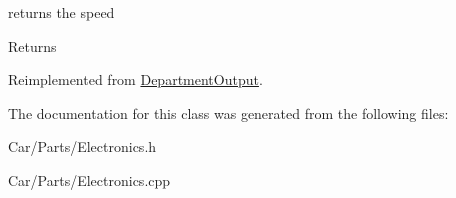 returns the speed \begin{DoxyReturn}{Returns}

\end{DoxyReturn}


Reimplemented from \hyperlink{classDepartmentOutput_a90caf8934a687d18b9855f19a421ecef}{Department\+Output}.



The documentation for this class was generated from the following files\+:\begin{DoxyCompactItemize}
\item 
Car/\+Parts/Electronics.\+h\item 
Car/\+Parts/Electronics.\+cpp\end{DoxyCompactItemize}
